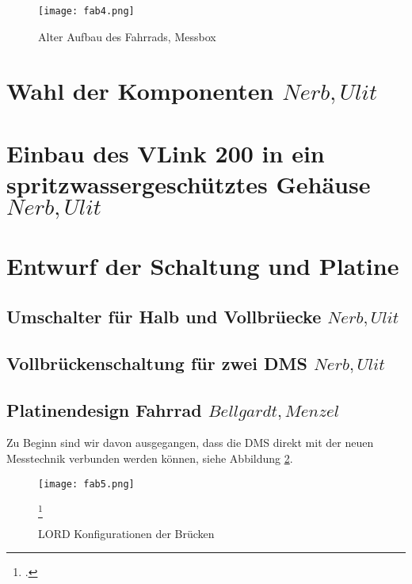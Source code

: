 \begin{figure}[h]
    \begin{center}
        \texttt{[image: fab4.png]}
        \caption[Alter Aufbau des Fahrrads, Messbox (Abbildungsverzeichnis)]{Alter Aufbau des Fahrrads, Messbox}
        
        \label{fig:fab4}
    \end{center}
\end{figure}



\section{Wahl der Komponenten \(Nerb, Ulit\)}


\section{Einbau des V\-Link 200 in ein spritzwassergesch\"utztes Geh\"ause \(Nerb, Ulit\)}
\section{Entwurf der Schaltung und Platine}




\subsection{Umschalter f\"ur Halb\- und Vollbr\"uecke \(Nerb, Ulit\)}
\subsection{Vollbr\"uckenschaltung f\"ur zwei DMS \(Nerb, Ulit\)}

\newpage{}
\subsection{Platinendesign Fahrrad \(Bellgardt, Menzel\)}
Zu Beginn sind wir davon ausgegangen, dass die DMS direkt mit der neuen Messtechnik verbunden werden können, siehe Abbildung \ref{fig:fab5}.
\begin{figure}[h]
    \begin{center}
        \texttt{[image: fab5.png]}
        \caption[LORD Konfigurationen der Brücken (Abbildungsverzeichnis)]{LORD Konfigurationen der Brücken}
        \footcite{VLInkManual
        }
        
        \label{fig:fab5}
    \end{center}
\end{figure}

